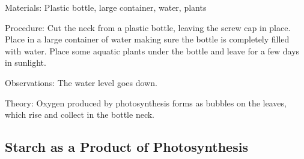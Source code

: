 \begin{multicols}{2}
\begin{description*}
\item[Materials:]{Plastic bottle, large container, water, plants}
\item[Procedure:]{Cut the neck from a plastic bottle, leaving the screw cap in place. Place in a large
container of water making sure the bottle is completely filled with water. Place some aquatic
plants under the bottle and leave for a few days in sunlight.}
\item[Observations:]{The water level goes down. }
\item[Theory:]{Oxygen produced by photosynthesis forms as bubbles on the
leaves, which rise and collect in the bottle neck.}
\end{description*}

%
%

\subsection{Starch as a Product of Photosynthesis} %


\end{multicols}
